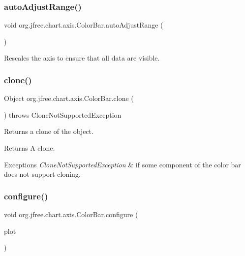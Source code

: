 \subsubsection{\texorpdfstring{auto\+Adjust\+Range()}{autoAdjustRange()}}
{\footnotesize\ttfamily void org.\+jfree.\+chart.\+axis.\+Color\+Bar.\+auto\+Adjust\+Range (\begin{DoxyParamCaption}{ }\end{DoxyParamCaption})}

Rescales the axis to ensure that all data are visible. \mbox{\label{classorg_1_1jfree_1_1chart_1_1axis_1_1_color_bar_aa43e936b97ef8f80578644e378855fa7}} 
\subsubsection{\texorpdfstring{clone()}{clone()}}
{\footnotesize\ttfamily Object org.\+jfree.\+chart.\+axis.\+Color\+Bar.\+clone (\begin{DoxyParamCaption}{ }\end{DoxyParamCaption}) throws Clone\+Not\+Supported\+Exception}

Returns a clone of the object.

\begin{DoxyReturn}{Returns}
A clone.
\end{DoxyReturn}

\begin{DoxyExceptions}{Exceptions}
{\em Clone\+Not\+Supported\+Exception} & if some component of the color bar does not support cloning. \\
\hline
\end{DoxyExceptions}
\mbox{\label{classorg_1_1jfree_1_1chart_1_1axis_1_1_color_bar_a4ffed2a6f7c447c463e583fff36a206f}} 
\subsubsection{\texorpdfstring{configure()}{configure()}}
{\footnotesize\ttfamily void org.\+jfree.\+chart.\+axis.\+Color\+Bar.\+configure (\begin{DoxyParamCaption}\item[{\mbox{\hyperlink{classorg_1_1jfree_1_1chart_1_1plot_1_1_contour_plot}{Contour\+Plot}}}]{plot }\end{DoxyParamCaption})}

